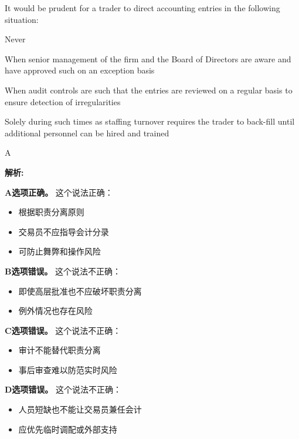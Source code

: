 \documentclass{article}
\newcounter{question} %
\newenvironment{explanation}
{\textbf{解析:}\par}
{\par}
\begin{document}
\begin{question}
    It would be prudent for a trader to direct accounting entries in the following situation:
\end{question}

\begin{choices}
    \item Never
    \item When senior management of the firm and the Board of Directors are aware and have approved such on an exception basis
    \item When audit controls are such that the entries are reviewed on a regular basis to ensure detection of irregularities
    \item Solely during such times as staffing turnover requires the trader to back-fill until additional personnel can be hired and trained
\end{choices}

\begin{correctanswer}
    A
\end{correctanswer}

\begin{explanation}
    \textbf{A选项正确。}
    这个说法正确：
    \begin{itemize}
        \item 根据职责分离原则
        \item 交易员不应指导会计分录
        \item 可防止舞弊和操作风险
    \end{itemize}

    \textbf{B选项错误。}
    这个说法不正确：
    \begin{itemize}
        \item 即使高层批准也不应破坏职责分离
        \item 例外情况也存在风险
    \end{itemize}

    \textbf{C选项错误。}
    这个说法不正确：
    \begin{itemize}
        \item 审计不能替代职责分离
        \item 事后审查难以防范实时风险
    \end{itemize}

    \textbf{D选项错误。}
    这个说法不正确：
    \begin{itemize}
        \item 人员短缺也不能让交易员兼任会计
        \item 应优先临时调配或外部支持
    \end{itemize}
\end{explanation}
\end{document}
